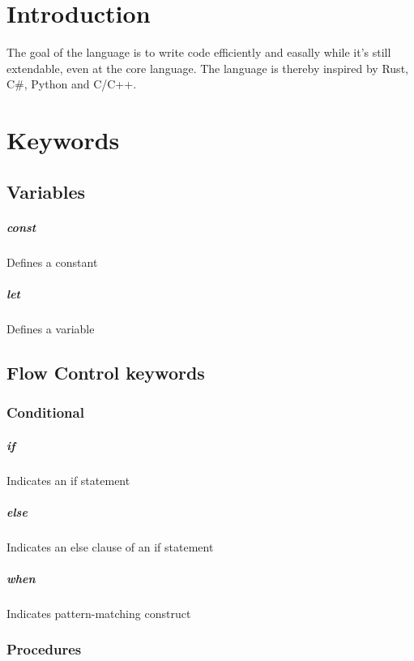 \documentclass{report}
\begin{document}
\chapter{Introduction}
The goal of the language is to write code efficiently and easally while it's still extendable, even at the core language.
The language is thereby inspired by Rust, C\#, Python and C/C++.


\chapter{Keywords}

\section{Variables}
\paragraph{const} Defines a constant
\paragraph{let} Defines a variable

\section{Flow Control keywords}

\subsection {Conditional}

\paragraph{if} Indicates an if statement
\paragraph{else} Indicates an else clause of an if statement
\paragraph{when} Indicates pattern-matching construct



\subsection{Procedures}
\end{document}
